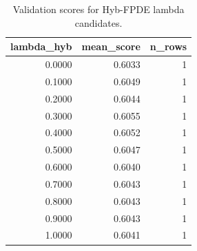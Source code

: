 \begin{table}[t]
\caption{Validation scores for Hyb-FPDE lambda candidates.}
\label{tab:lambda_distribution_computed}
\centering
\begin{tabular}{rrr}
\toprule
lambda\_hyb & mean\_score & n\_rows \\
\midrule
0.0000 & 0.6033 & 1 \\
0.1000 & 0.6049 & 1 \\
0.2000 & 0.6044 & 1 \\
0.3000 & 0.6055 & 1 \\
0.4000 & 0.6052 & 1 \\
0.5000 & 0.6047 & 1 \\
0.6000 & 0.6040 & 1 \\
0.7000 & 0.6043 & 1 \\
0.8000 & 0.6043 & 1 \\
0.9000 & 0.6043 & 1 \\
1.0000 & 0.6041 & 1 \\
\bottomrule
\end{tabular}

\end{table}
